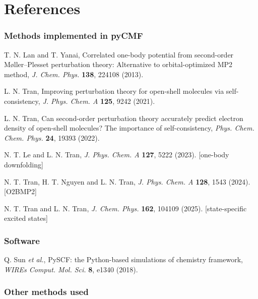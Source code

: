 \chapter{References}
\label{ch:references}

\subsection*{Methods implemented in pyCMF}

\begin{enumerate}[label={[\arabic*]}]
  \item T. N. Lan and T. Yanai, Correlated one-body potential from
        second-order M\o ller--Plesset perturbation theory: Alternative to
        orbital-optimized MP2 method, \emph{J. Chem. Phys.} \textbf{138},
        224108 (2013).
  \item L. N. Tran, Improving perturbation theory for open-shell molecules
        via self-consistency, \emph{J. Phys. Chem. A} \textbf{125}, 9242
        (2021).
  \item L. N. Tran, Can second-order perturbation theory accurately predict
        electron density of open-shell molecules? The importance of
        self-consistency, \emph{Phys. Chem. Chem. Phys.} \textbf{24}, 19393
        (2022).
  \item N. T. Le and L. N. Tran, \emph{J. Phys. Chem. A} \textbf{127}, 5222
        (2023). [one-body downfolding]
  \item N. T. Tran, H. T. Nguyen and L. N. Tran, \emph{J. Phys. Chem. A}
        \textbf{128}, 1543 (2024). [O2BMP2]
  \item N. T. Tran and L. N. Tran, \emph{J. Chem. Phys.} \textbf{162}, 104109
        (2025). [state-specific excited states]
\end{enumerate}

\subsection*{Software}

\begin{enumerate}[label={[\arabic*]},resume]
  \item Q. Sun \emph{et al.}, PySCF: the Python-based simulations of
        chemistry framework, \emph{WIREs Comput. Mol. Sci.} \textbf{8}, e1340
        (2018).
\end{enumerate}

\subsection*{Other methods used}


